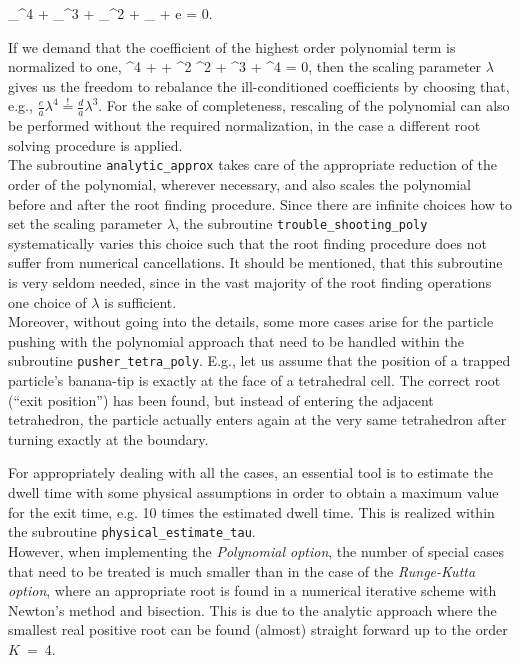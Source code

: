 \documentclass{TheMartianReport}
\begin{document}
\be{}
 _{\tilde{\tau}^4} +  _{\tilde{\tau}^3} +  _{\tilde{\tau}^2} +  \underbrace{\lambda \tau}_{\tilde{\tau}} + e = 0.
\ee

If we demand that the coefficient of the highest order polynomial term is normalized to one,
\be{}
{\tilde{\tau}^4} +   +  \lambda^2 {\tilde{\tau}^2} +  \lambda^3 {\tilde{\tau}} +  \lambda^4 = 0,
\ee
then the scaling parameter $\lambda$ gives us the freedom to rebalance the ill-conditioned coefficients by choosing that, e.g., $\frac{e}{a} \lambda^4 \overset{!}{=} \frac{d}{a} \lambda^3$. For the sake of completeness, rescaling of the polynomial can also be performed without the required normalization, in the case a different root solving procedure is applied.\\
%
The subroutine \texttt{analytic\_approx} takes care of the appropriate reduction of the order of the polynomial, wherever necessary, and also scales the polynomial before and after the root finding procedure. Since there are infinite choices how to set the scaling parameter $\lambda$, the subroutine \texttt{trouble\_shooting\_poly} systematically varies this choice such that the root finding procedure does not suffer from numerical cancellations.
It should be mentioned, that this subroutine is very seldom needed, since in the vast majority of the root finding operations one choice of $\lambda$ is sufficient.\\
%
Moreover, without going into the details, some more cases arise for the particle pushing with the polynomial approach that need to be handled within the subroutine \texttt{pusher\_tetra\_poly}. E.g., let us assume that the position of a trapped particle's banana-tip is exactly at the face of a tetrahedral cell. The correct root (``exit position'') has been found, but instead of entering the adjacent tetrahedron, the particle actually enters again at the very same tetrahedron after turning exactly at the boundary. 

For appropriately dealing with all the cases, an essential tool is to estimate the dwell time with some physical assumptions in order to obtain a maximum value for the exit time, e.g. 10 times the estimated dwell time. This is realized within the subroutine \texttt{physical\_estimate\_tau}.\\
%
However, when implementing the \textit{Polynomial option}, the number of special cases that need to be treated is much smaller than in the case of the \textit{Runge-Kutta option}, where an appropriate root is found in a numerical iterative scheme with Newton's method and bisection. This is due to the analytic approach where the smallest real positive root can be found (almost) straight forward up to the order $K$~=~4.
\end{document}
